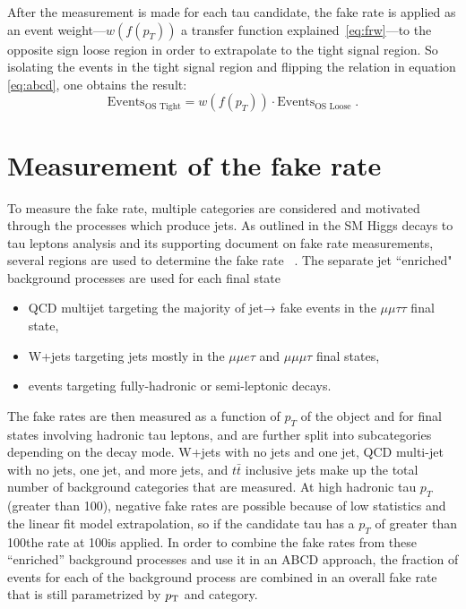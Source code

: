 After the measurement is made for each tau candidate, the fake rate is applied as an event weight---$w(f(p_T))$ a transfer function explained~\ref{eq:frw}---to the opposite sign loose region in order to extrapolate to the tight signal region. So isolating the events in the tight signal region and flipping the relation in equation \ref{eq:abcd}, one obtains the result: 
\begin{equation}
\text{Events}_\text{OS Tight} = w(f(p_T))\cdot \text{Events}_\text{OS Loose} \;\text{.}
\end{equation}

\section{Measurement of the fake rate}
To measure the fake rate, multiple categories are considered and motivated through the processes which produce jets. As outlined in the SM Higgs decays to tau leptons analysis and its supporting document on fake rate measurements, several regions are used to determine the fake rate ~\cite{SMHTTarXiv}. The separate jet ``enriched" background processes are used for each final state
\begin{itemize}
	\item QCD multijet targeting the majority of jet→ \tauh fake events in the $\mu\mu\tau\tau$ final state,
	\item W+jets targeting jets mostly in the $\mu\mu e\tau$ and $\mu\mu\mu\tau$ final states,
	\item \ttbar events targeting fully-hadronic or semi-leptonic decays.
\end{itemize} 



The fake rates are then measured as a function of $p_T$ of the object and for final states involving hadronic tau leptons, and are further split into subcategories depending on the decay mode.  
W+jets with no jets and one jet, QCD multi-jet with no jets, one jet, and more jets, and $t\bar{t}$ inclusive jets make up the total number of background categories that are measured. 
At high hadronic tau $p_T$ (greater than 100\GeV), negative fake rates are possible because of low statistics and the linear fit model extrapolation, so if the candidate tau has a $p_T$ of greater than 100\GeV the rate at 100\GeV is applied. 
In order to combine the fake rates from these ``enriched'' background processes and use it in an ABCD approach, the fraction of events for each of the background process are combined in an overall fake rate that is still parametrized by $p_{\mathrm{T}}$ and category.  

